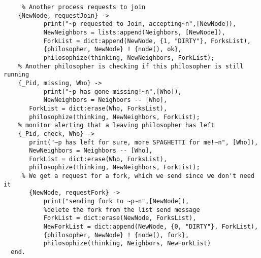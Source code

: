 \documentclass[11pt]{article}
\begin{document}
\begin{lstlisting}
     % Another process requests to join
    {NewNode, requestJoin} ->
           print("~p requested to Join, accepting~n",[NewNode]),
           NewNeighbors = lists:append(Neighbors, [NewNode]),
           ForkList = dict:append(NewNode, {1, "DIRTY"}, ForksList),
           {philosopher, NewNode} ! {node(), ok},
           philosophize(thinking, NewNeighbors, ForkList);
    % Another philosopher is checking if this philosopher is still running
    {_Pid, missing, Who} ->
           print("~p has gone missing!~n",[Who]),
           NewNeighbors = Neighbors -- [Who],
	   ForkList = dict:erase(Who, ForksList),
	   philosophize(thinking, NewNeighbors, ForkList);
    % monitor alerting that a leaving philosopher has left
    {_Pid, check, Who} ->
	   print("~p has left for sure, more SPAGHETTI for me!~n", [Who]),
	   NewNeighbors = Neighbors -- [Who],
	   ForkList = dict:erase(Who, ForksList),
	   philosophize(thinking, NewNeighbors, ForkList);
     % We get a request for a fork, which we send since we don't need it       
       {NewNode, requestFork} ->
           print("sending fork to ~p~n",[NewNode]),
           %delete the fork from the list send message
           ForkList = dict:erase(NewNode, ForksList),
           NewForkList = dict:append(NewNode, {0, "DIRTY"}, ForkList),
           {philosopher, NewNode} ! {node(), fork},
           philosophize(thinking, Neighbors, NewForkList)
  end.



\end{lstlisting}
\end{document}
